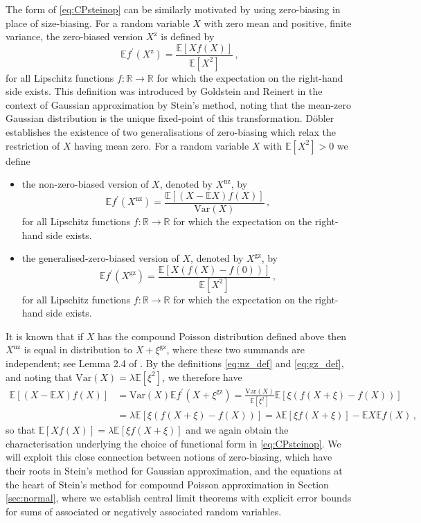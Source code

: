 \documentclass[12pt]{article}
\begin{document}
The form of \eqref{eq:CPsteinop} can be similarly motivated by using zero-biasing in place of size-biasing. For a random variable $X$ with zero mean and positive, finite variance, the zero-biased version $X^\text{z}$ is defined by
\begin{equation}\label{eq:zb_def}
\mathbb{E}f^\prime(X^\text{z})=\frac{\mathbb{E}[Xf(X)]}{\mathbb{E}[X^2]}\,,
\end{equation} 
for all Lipschitz functions $f:\mathbb{R}\to\mathbb{R}$ for which the expectation on the right-hand side exists. This definition was introduced by Goldstein and Reinert \cite{goldstein97} in the context of Gaussian approximation by Stein's method, noting that the mean-zero Gaussian distribution is the unique fixed-point of this transformation. D\"obler \cite{dobler17} establishes the existence of two generalisations of zero-biasing which relax the restriction of $X$ having mean zero. For a random variable $X$ with $\mathbb{E}[X^2]>0$ we define
\begin{itemize}
\item the non-zero-biased version of $X$, denoted by $X^\text{nz}$, by
\begin{equation}\label{eq:nz_def}
\mathbb{E}f^\prime(X^\text{nz})=\frac{\mathbb{E}[(X-\mathbb{E}X)f(X)]}{\text{Var}(X)}\,,
\end{equation}
for all Lipschitz functions $f:\mathbb{R}\to\mathbb{R}$ for which the expectation on the right-hand side exists.
\item the generalised-zero-biased version of $X$, denoted by $X^\text{gz}$, by
\begin{equation}\label{eq:gz_def}
\mathbb{E}f^\prime(X^\text{gz})=\frac{\mathbb{E}[X(f(X)-f(0))]}{\mathbb{E}[X^2]}\,,
\end{equation}
for all Lipschitz functions $f:\mathbb{R}\to\mathbb{R}$ for which the expectation on the right-hand side exists.
\end{itemize}
It is known that if $X$ has the compound Poisson distribution defined above then $X^\text{nz}$ is equal in distribution to $X+\xi^\text{gz}$, where these two summands are independent; see Lemma 2.4 of \cite{daly22}. By the definitions \eqref{eq:nz_def} and \eqref{eq:gz_def}, and noting that $\text{Var}(X)=\lambda\mathbb{E}[\xi^2]$, we therefore have
\begin{align*}
\mathbb{E}[(X-\mathbb{E}X)f(X)]&=\text{Var}(X)\mathbb{E}f^\prime(X+\xi^\text{gz})=\frac{\text{Var}(X)}{\mathbb{E}[\xi^2]}\mathbb{E}[\xi(f(X+\xi)-f(X))]\\
&=\lambda\mathbb{E}[\xi(f(X+\xi)-f(X))]=\lambda\mathbb{E}[\xi f(X+\xi)]-\mathbb{E}X\mathbb{E}f(X)\,,
\end{align*}
so that $\mathbb{E}[Xf(X)]=\lambda\mathbb{E}[\xi f(X+\xi)]$ and we again obtain the characterisation underlying the choice of functional form in \eqref{eq:CPsteinop}. We will exploit this close connection between notions of zero-biasing, which have their roots in Stein's method for Gaussian approximation, and the equations at the heart of Stein's method for compound Poisson approximation in Section \ref{sec:normal}, where we establish central limit theorems with explicit error bounds for sums of associated or negatively associated random variables. 
\end{document}
